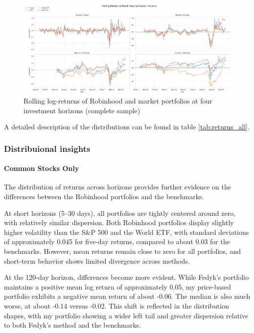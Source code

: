 \begin{figure}[h!]
    \centering
    \includegraphics[width=1\linewidth]
    {../images/returns/comparison_2.png}
    \caption{Rolling log-returns of Robinhood and market portfolios at four investment horizons (complete sample)}
\end{figure}

A detailed description of the distributions can be found in table \ref{tab:returns_all}.

\subsubsection{Distribuional insights}
\paragraph{Common Stocks Only}

The distribution of returns across horizons provides further evidence on the differences between the Robinhood portfolios and the benchmarks.

At short horizons (5–30 days), all portfolios are tightly centered around zero, with relatively similar dispersion. 
Both Robinhood portfolios display slightly higher volatility than the S\&P 500 and the World ETF, with standard deviations of approximately 0.045 for five-day returns, compared to about 0.03 for the benchmarks. 
However, mean returns remain close to zero for all portfolios, and short-term behavior shows limited divergence across methods.

At the 120-day horizon, differences become more evident. 
While Fedyk's portfolio maintains a positive mean log return of approximately 0.05, my price-based portfolio exhibits a negative mean return of about -0.06. 
The median is also much worse, at about -0.14 versus -0.02.
This shift is reflected in the distribution shapes, with my portfolio showing a wider left tail and greater dispersion relative to both Fedyk’s method and the benchmarks.

